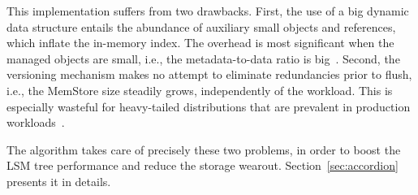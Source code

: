 This implementation suffers from two drawbacks. First, the use of a big dynamic data structure entails 
the abundance of auxiliary small objects and references, which inflate the in-memory index. 
The overhead is most significant when the managed objects
are small, i.e., the metadata-to-data ratio is big~\cite{Wu2015}. Second, the versioning mechanism 
makes no attempt to eliminate redundancies prior to flush, i.e., the MemStore size  steadily grows, 
independently of the workload. This is especially wasteful for heavy-tailed distributions that are 
prevalent in production workloads~\cite{Devineni:2015}. 

The \sys\/ algorithm takes care of precisely these two problems, in order to boost the 
LSM tree performance and reduce the storage wearout. Section~\ref{sec:accordion} 
presents it in details. 







